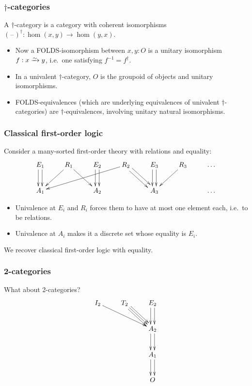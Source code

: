 \documentclass{beamer}
\newcommand{\blank}{\mathord{\hspace{1pt}\text{--}\hspace{1pt}}}
\begin{document}
\begin{frame}[t]
  \frametitle{$\dagger$-categories}
  \begin{definition}
    A \alert<1>{$\dagger$-category} is a category with coherent isomorphisms $(\blank)^\dagger : \hom(x,y) \to \hom(y,x)$.
  \end{definition}
  \pause
  \begin{itemize}
  \item Now a FOLDS-isomorphism between $x,y:O$ is a \alert{unitary isomorphism} $f:x\toiso y$, i.e.\ one satisfying $f^{-1} = f^\dagger$.
  \item In a univalent $\dagger$-category, $O$ is the groupoid of objects and unitary isomorphisms.
  \item FOLDS-equivalences (which are underlying equivalences of univalent $\dagger$-categories) are \alert{$\dagger$-equivalences}, involving unitary natural isomorphisms.
  \end{itemize}
\end{frame}

\begin{frame}
  \frametitle{Classical first-order logic}
  Consider a many-sorted first-order theory with relations and equality:
  \[ \xymatrix{
    E_1 \ar@<1mm>[d] \ar@<-1mm>[d] & R_1 \ar[dl] \ar[dr] & E_2 \ar@<1mm>[d] \ar@<-1mm>[d] & R_2 \ar[dlll] \ar@<1mm>[dr] \ar@<-1mm>[dr] & E_3 \ar@<1mm>[d] \ar@<-1mm>[d] & R_3 \ar[dl] & \dots \\
    A_1 && A_2 && A_3 && \dots
  }\]
  \begin{itemize}
  \item Univalence at $E_i$ and $R_i$ forces them to have at most one element each, i.e.\ to be relations.
  \item Univalence at $A_i$ makes it a discrete set whose equality is $E_i$.
  \end{itemize}
  We recover classical first-order logic with equality.
\end{frame}

\begin{frame}[t]
  \frametitle{2-categories}
  What about 2-categories?
  \[
  \vcenter{\xymatrix{
      I_2 \ar[drr] & T_2 \ar[dr] \ar@<1mm>[dr] \ar@<-1mm>[dr] & E_2 \ar@<1mm>[d] \ar@<-1mm>[d] \\
      && A_2 \ar@<1mm>[d] \ar@<-1mm>[d]\\
      && A_1 \ar@<1mm>[d] \ar@<-1mm>[d] \\
      && O}}
  \]
\end{frame}
\end{document}
